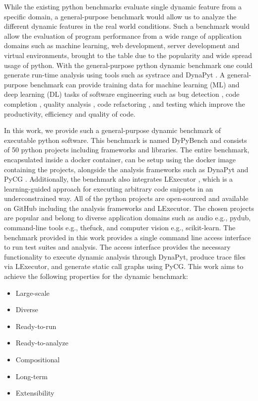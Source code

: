 While the existing python benchmarks evaluate single dynamic feature from a specific domain, a general-purpose benchmark would allow us to analyze the different dynamic features in the real world conditions.
Such a benchmark would allow the evaluation of program performance from a wide range of application domains such as machine learning, web development, server development and virtual environments, brought to the table due to the popularity and wide spread usage of python.
With the general-purpose python dynamic benchmark one could generate run-time analysis using tools such as systrace \cite{systrace} and DynaPyt \cite{DynaPyt2022}.
A general-purpose benchmark can provide training data for machine learning (ML) and deep learning (DL) tasks of software engineering such as bug detection \cite{DeepBugs2018}, code completion \cite{code_completion}, quality analysis \cite{Code_analysis_1, Code_analysis_2}, code refactoring \cite{code_refactoring}, and testing \cite{testing_1, testing_2, testing_3} which improve the productivity, efficiency and quality of code.

In this work, we provide such a general-purpose dynamic benchmark of executable python software. This benchmark is named DyPyBench and consists of 50 python projects including frameworks and libraries.
The entire benchmark, encapsulated inside a docker container, can be setup using the docker image containing the projects, alongside the analysis frameworks such as DynaPyt \cite{DynaPyt2022} and PyCG \cite{PyCG_2021}. Additionally, the benchmark also integrates LExecutor \cite{LExecutor_2023}, which is a learning-guided approach for executing arbitrary code snippets in an underconstrained way. 
All of the python projects are open-sourced and available on GitHub \cite{github} including the analysis frameworks and LExecutor.
The chosen projects are popular and belong to diverse application domains such as audio e.g., pydub, command-line tools e.g., thefuck, and computer vision e.g., scikit-learn.
The benchmark provided in this work provides a single command line access interface to run test suites and analysis.
The access interface provides the necessary functionality to execute dynamic analysis through DynaPyt, produce trace files via LExecutor, and generate static call graphs using PyCG.
This work aims to achieve the following properties for the dynamic benchmark:
\begin{itemize}
    \item Large-scale
    \item Diverse
    \item Ready-to-run
    \item Ready-to-analyze
    \item Compositional
    \item Long-term
    \item Extensibility
\end{itemize}

